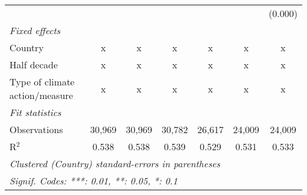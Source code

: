 \begin{tabular}{lcccccc}
                                                     &              &              &               &               &               & (0.000)\\   
   \emph{Fixed effects}\\
   Country                                           & x            & x            & x             & x             & x             & x\\  
   Half decade                                       & x            & x            & x             & x             & x             & x\\  
   Type of climate action/measure                    & x            & x            & x             & x             & x             & x\\  
   \midrule \emph{Fit statistics}\\
   Observations                                      & 30,969       & 30,969       & 30,782        & 26,617        & 24,009        & 24,009\\  
   R$^2$                                             & 0.538        & 0.538        & 0.539         & 0.529         & 0.531         & 0.533\\  
   \midrule
   \multicolumn{7}{l}{\emph{Clustered (Country) standard-errors in parentheses}}\\
   \multicolumn{7}{l}{\emph{Signif. Codes: ***: 0.01, **: 0.05, *: 0.1}}\\
\end{tabular}
\par\endgroup


